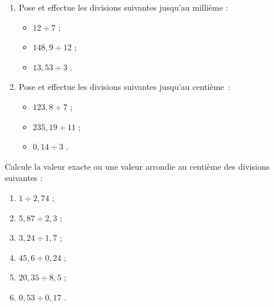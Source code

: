 \begin{exercice} 
\begin{enumerate} 
 \item Pose et effectue les divisions suivantes jusqu'au millième :
 \begin{itemize}
  \item $12 \div 7$ \dotfill ; \hspace*{10em}
  
  \item $148,9 \div 12$ \dotfill ; \hspace*{10em}
  
  \item $13,53 \div 3$ \dotfill. \hspace*{10em}
  \end{itemize}
 \item Pose et effectue les divisions suivantes jusqu'au centième :
  \begin{itemize}
  \item $123,8 \div 7$ \dotfill ; \hspace*{10em}
  
  \item $235,19 \div 11$ \dotfill ; \hspace*{10em}
  
  \item $0,14 \div 3$ \dotfill. \hspace*{10em}
  \end{itemize}
 \end{enumerate}
\end{exercice}


\begin{exercice} 
Calcule la valeur exacte ou une valeur arrondie au centième des divisions suivantes :
\begin{enumerate} 
 \item $1 \div 2,74$ \dotfill ; \hspace*{11em}

 \item $5,87 \div 2,3$ \dotfill ; \hspace*{11em}

 \item $3,24 \div 1,7$ \dotfill ; \hspace*{11em}

 \item $45,6 \div 0,24$ \dotfill ; \hspace*{11em}

 \item $20,35 \div 8,5$ \dotfill ; \hspace*{11em}

 \item $0,53 \div 0,17$ \dotfill. \hspace*{11em}
 \end{enumerate}
\end{exercice}



